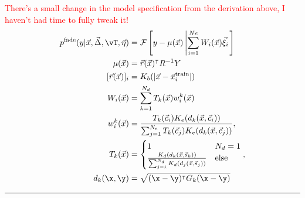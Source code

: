 		\begin{table}
			\textcolor{red}{There's a small change in the model specification from the derivation above, I haven't had time to fully tweak it!}
			\large
			\begin{align}
				p^\text{fade}(y | \vec{x},\vec{\Delta}, \vT, \vec{\eta}) & = \mathcal{F}\left[y - \mu(\vec{x}) \left| \sum_{i=1}^{Ne} W_i(\vec{x})\vec{\xi}_i\right.\right]
				\\
				\mu(\vec{x})                                             & = \vec{r}(\vec{x})^\intercal R^{-1} Y
				\\
				[\vec{r}(\vec{x})]_i                                     & = K_b(|\vec{x} - \vec{x}_i^\text{train}|)
				\\
				W_i(\vec{x})                                             & = \sum_{k=1}^{N_d} T_k(\vec{x}) w_i^k(\vec{x})
				\\
				w_i^k(\vec{x})                                           & = \frac{T_k(\vec{c}_i) K_e(d_k(\vec{x},\vec{c}_i))}{\sum_{j=1}^{N_e} T_k(\vec{c}_j) K_e(d_k(\vec{x},\vec{c}_j))},
				\\
				T_k(\vec{x})                                             & =  \begin{cases}
					                                                              1                                              & N_d = 1     \\
					                                                              \frac{K_d(d_k(\vec{x},\vec{s}_k))}
					                                                              {\sum_{j=1}^{N_d} K_d(d_j(\vec{x},\vec{s}_j))} & \text{else}
				                                                              \end{cases},
				\\
				d_k(\x,\y)                                               & = \sqrt{(\x-\y)^\intercal G_k (\x -\y)}
			\end{align}
			\hrule


\end{table}
